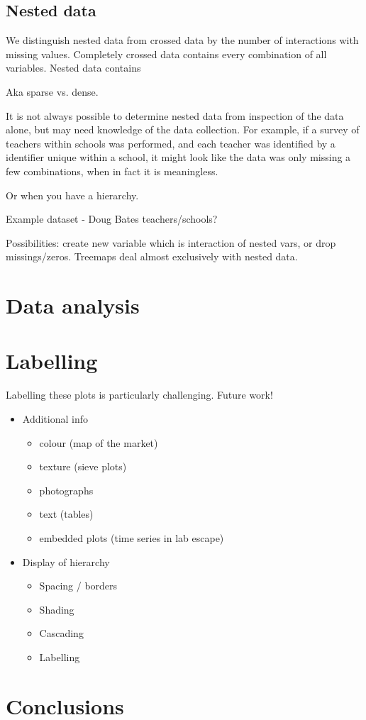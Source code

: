 \documentclass[letterpaper,oneside]{scrartcl}
\begin{document}
\subsection{Nested data}
\label{sub:nested_data}

We distinguish nested data from crossed data by the number of interactions with missing values.  Completely crossed data contains every combination of all variables.  Nested data contains 

Aka sparse vs. dense.

It is not always possible to determine nested data from inspection of the data alone, but may need knowledge of the data collection.  For example, if a survey of teachers within schools was performed, and each teacher was identified by a identifier unique within a school, it might look like the data was only missing a few combinations, when in fact it is meaningless.  

Or when you have a hierarchy.

Example dataset - Doug Bates teachers/schools?

Possibilities: create new variable which is interaction of nested vars, or drop missings/zeros.  Treemaps deal almost exclusively with nested data.

\section{Data analysis} %
\label{sec:data_analysis}


\section{Labelling}
\label{sec:legends}

Labelling these plots is particularly challenging.  Future work!

\begin{itemize}
  \item Additional info 
  \begin{itemize}
    \item colour (map of the market)
    \item texture (sieve plots)
    \item photographs
    \item text (tables)
    \item embedded plots (time series in lab escape)
  \end{itemize}
  
  \item Display of hierarchy
  \begin{itemize}
    \item Spacing / borders
    \item Shading
    \item Cascading
    \item Labelling
  \end{itemize}
\end{itemize}

\section{Conclusions} %
\label{sec:conclusions}



\end{document}

